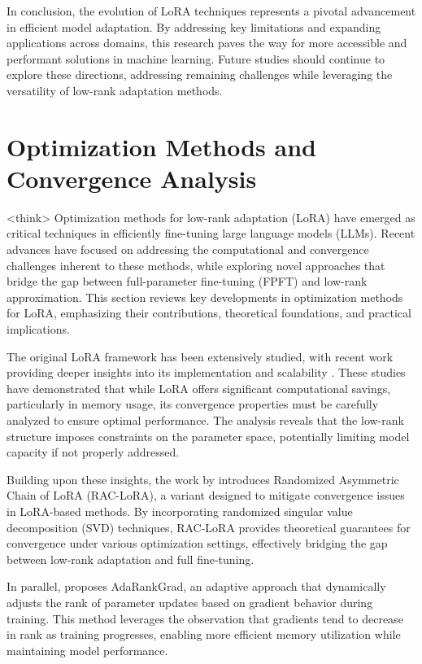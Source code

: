 \documentclass[conference]{IEEEtran}
\begin{document}
In conclusion, the evolution of LoRA techniques represents a pivotal advancement in efficient model adaptation. By addressing key limitations and expanding applications across domains, this research paves the way for more accessible and performant solutions in machine learning. Future studies should continue to explore these directions, addressing remaining challenges while leveraging the versatility of low-rank adaptation methods.

\section{Optimization Methods and Convergence Analysis}
<think>
Optimization methods for low-rank adaptation (LoRA) have emerged as critical techniques in efficiently fine-tuning large language models (LLMs). Recent advances have focused on addressing the computational and convergence challenges inherent to these methods, while exploring novel approaches that bridge the gap between full-parameter fine-tuning (FPFT) and low-rank approximation. This section reviews key developments in optimization methods for LoRA, emphasizing their contributions, theoretical foundations, and practical implications.

The original LoRA framework has been extensively studied, with recent work providing deeper insights into its implementation and scalability \cite{bX}. These studies have demonstrated that while LoRA offers significant computational savings, particularly in memory usage, its convergence properties must be carefully analyzed to ensure optimal performance. The analysis reveals that the low-rank structure imposes constraints on the parameter space, potentially limiting model capacity if not properly addressed.

Building upon these insights, the work by \cite{bX} introduces Randomized Asymmetric Chain of LoRA (RAC-LoRA), a variant designed to mitigate convergence issues in LoRA-based methods. By incorporating randomized singular value decomposition (SVD) techniques, RAC-LoRA provides theoretical guarantees for convergence under various optimization settings, effectively bridging the gap between low-rank adaptation and full fine-tuning.

In parallel, \cite{bX} proposes AdaRankGrad, an adaptive approach that dynamically adjusts the rank of parameter updates based on gradient behavior during training. This method leverages the observation that gradients tend to decrease in rank as training progresses, enabling more efficient memory utilization while maintaining model performance.
\end{document}
